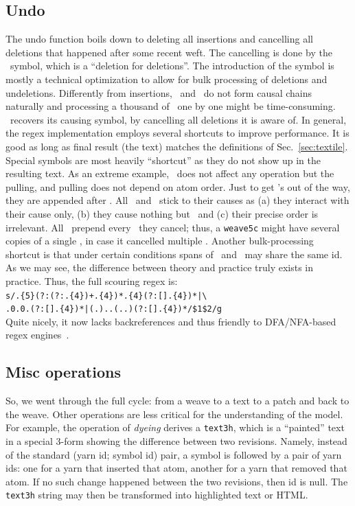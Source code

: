 \documentclass{sig-alternate}
\begin{document}
\subsection{Undo}	\label{sec:undo}

The undo function boils down to deleting all insertions and cancelling all deletions that happened after some recent weft.
The cancelling is done by the \cnc ~symbol, which is a ``deletion for deletions''.
The introduction of the symbol is mostly a technical optimization to allow for bulk processing of deletions and undeletions. 
Differently from insertions, \bsp ~and \cnc ~do not form causal chains naturally and processing a thousand of \bsp ~one by one might be time-consuming.
\cnc ~recovers its causing symbol, by cancelling all deletions it is aware of.
In general, the regex implementation employs several shortcuts to improve performance.
It is good as long as final result (the text) matches the definitions of Sec.~\ref{sec:textile}.
Special symbols are most heavily ``shortcut'' as they do not show up in the resulting text.
As an extreme example, \zero ~does not affect any operation but the pulling, and pulling does not depend on atom order.
Just to get \zero's out of the way, they are appended after \eoa.
All \bsp ~and \cnc ~stick to their causes as (a) they interact with their cause only, (b) they cause nothing but \zero ~and (c) their precise order is irrelevant.
All \cnc ~prepend every \bsp ~they cancel; thus, a {\tt weave5c} might have  several copies of a single \cnc, in case it cancelled multiple \bsp.
Another bulk-processing shortcut is that under certain conditions spans of \bsp ~and \cnc ~may share the same id.
As we may see, the difference between theory and practice truly exists in practice.
Thus, the full scouring regex is: \\
{\small \verb`s/.{5}(?:(?:`\cnc\verb`.{4})+`\bsp\verb`.{4})*`\bsp\verb`.{4}(?:[`\bsp\verb``\cnc\verb`].{4})*|\`\\
\verb`.0.0.(?:[`\bsp\zero\cnc\verb`].{4})*|`\verb`(.)..(..)(?:[`\bsp\verb``\cnc\verb`].{4})*/$1$2/g`}\\
Quite nicely, it now lacks backreferences and thus friendly to DFA/NFA-based regex engines~\cite{re2}.

\subsection{Misc operations}

So, we went through the full cycle: from a weave to a text to a patch and back to the weave.
Other operations are less critical for the understanding of the model.
For example, the operation of \emph{dyeing} derives a {\tt text3h}, which is a ``painted'' text in a special 3-form showing the difference between two revisions. 
Namely, instead of the standard (yarn id; symbol id) pair, a symbol is followed by a pair of yarn ids: one for a yarn that inserted that atom, another for a yarn that removed that atom.
If no such change happened between the two revisions, then id is null.
The {\tt text3h} string may then be transformed into highlighted text or HTML.
\end{document}
